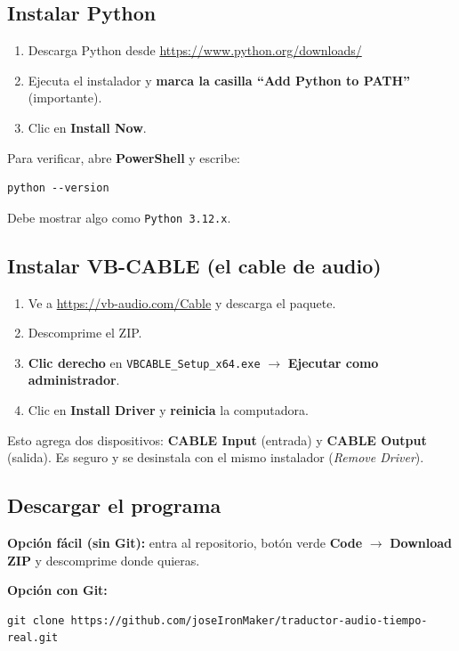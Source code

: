 \documentclass[11pt,a4paper]{article}
\begin{document}
\subsection{Instalar Python}
\begin{enumerate}[leftmargin=*]
  \item Descarga Python desde \url{https://www.python.org/downloads/}
  \item Ejecuta el instalador y \textbf{marca la casilla ``Add Python to PATH''} (importante).
  \item Clic en \textbf{Install Now}.
\end{enumerate}
Para verificar, abre \textbf{PowerShell} y escribe:
\begin{lstlisting}
python --version
\end{lstlisting}
Debe mostrar algo como \texttt{Python 3.12.x}.

\subsection{Instalar VB-CABLE (el cable de audio)}
\begin{enumerate}[leftmargin=*]
  \item Ve a \url{https://vb-audio.com/Cable} y descarga el paquete.
  \item Descomprime el ZIP.
  \item \textbf{Clic derecho} en \texttt{VBCABLE\_Setup\_x64.exe} $\rightarrow$ \textbf{Ejecutar como administrador}.
  \item Clic en \textbf{Install Driver} y \textbf{reinicia} la computadora.
\end{enumerate}
Esto agrega dos dispositivos: \textbf{CABLE Input} (entrada) y \textbf{CABLE Output}
(salida). Es seguro y se desinstala con el mismo instalador (\textit{Remove Driver}).

\subsection{Descargar el programa}
\textbf{Opción fácil (sin Git):} entra al repositorio, botón verde \textbf{Code}
$\rightarrow$ \textbf{Download ZIP} y descomprime donde quieras.

\noindent\textbf{Opción con Git:}
\begin{lstlisting}
git clone https://github.com/joseIronMaker/traductor-audio-tiempo-real.git
\end{lstlisting}
\end{document}
